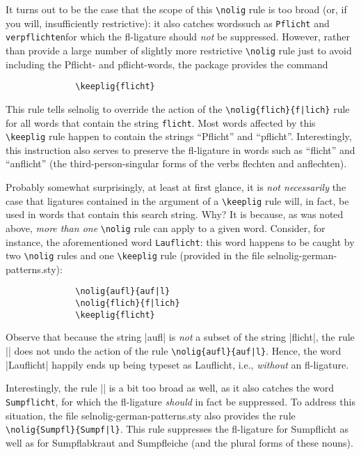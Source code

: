 \documentclass[11pt]{article}
\newcommand{\pkg}[1]{\textsf{#1}}
\newcommand{\opt}[1]{\texttt{#1}}
\newcommand{\cmmd}[1]{\texttt{\textbackslash #1}}
\begin{document}
It turns out to be the case that the scope of this \cmmd{nolig} rule is too broad (or, if you will, insufficiently restrictive): it also catches words\textemdash such as \opt{Pflicht} and \opt{verpflichten}\textemdash for which the fl-ligature should \emph{not} be suppressed. However, rather than provide a large number of slightly more restrictive \cmmd{nolig} rule just to avoid including the Pflicht- and pflicht-words, the package provides the command
\begin{Verbatim}
              \keeplig{flicht}
\end{Verbatim}
This rule tells \pkg{selnolig} to override the action of the \Verb+\nolig{flich}{f|lich}+ rule for all words that contain the string \opt{flicht}. Most words affected by this \cmmd{keeplig} rule happen to contain the strings \enquote{Pflicht} and \enquote{pflicht}. Interestingly, this instruction also serves to preserve the fl-ligature in words such as \enquote{flicht} and \enquote{anflicht} (the third-person-singular forms of the verbs flechten and anflechten). 

Probably somewhat surprisingly, at least at first glance, it is \emph{not necessarily} the case that ligatures contained in the argument of a \cmmd{keeplig} rule will, in fact, be used in words that contain this search string. Why? It is because, as was noted above, \emph{more than one} \cmmd{nolig} rule can apply to a given word. Consider, for instance, the aforementioned word \opt{Lauflicht}: this word happens to be caught by two \cmmd{nolig} rules and one \cmmd{keeplig} rule (provided in the file \pkg{selnolig-german-patterns.sty}):
\begin{Verbatim}
              \nolig{aufl}{auf|l}
              \nolig{flich}{f|lich}
              \keeplig{flicht}
\end{Verbatim}
Observe that because the string |aufl| is \emph{not} a subset of the string |flicht|, the rule || does not undo the action of the rule \Verb+\nolig{aufl}{auf|l}+. Hence, the word |Lauflicht| happily ends up being typeset as Lauflicht, i.e., \emph{without} an fl-ligature. 

Interestingly, the rule || is a bit too broad as well, as it also catches the word \opt{Sumpf\-licht}, for which the fl-ligature \emph{should} in fact be suppressed. To address this situation, the file \pkg{selnolig-german-patterns.sty} also provides the rule 
\Verb+\nolig{Sumpfl}{Sumpf|l}+. This rule suppresses the fl-ligature for Sumpflicht as well as for Sumpflabkraut and Sumpfleiche (and the plural forms of these nouns).
\end{document}
